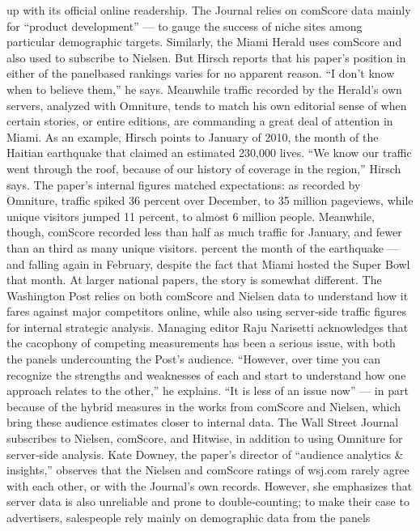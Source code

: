 up with its official online readership. The Journal relies on comScore data
mainly for ``product development'' — to gauge the success of niche sites
among particular demographic targets.
Similarly, the Miami Herald uses comScore and also used to subscribe to
Nielsen. But Hirsch reports that his paper’s position in either of the panelbased
rankings varies for no apparent reason. ``I don’t know when to
believe them,'' he says. Meanwhile traffic recorded by the Herald’s own
servers, analyzed with Omniture, tends to match his own editorial sense
of when certain stories, or entire editions, are commanding a great deal of
attention in Miami.
As an example, Hirsch points to January of 2010, the month of the Haitian
earthquake that claimed an estimated 230,000 lives. ``We know our traffic
went through the roof, because of our history of coverage in the region,''
Hirsch says. The paper’s internal figures matched expectations: as
recorded by Omniture, traffic spiked 36 percent over December, to 35
million pageviews, while unique visitors jumped 11 percent, to almost 6
million people. Meanwhile, though, comScore recorded less than half as
much traffic for January, and fewer than an third as many unique visitors.
percent the month of the earthquake — and falling again in February,
despite the fact that Miami hosted the Super Bowl that month.
At larger national papers, the story is somewhat different. The Washington
Post relies on both comScore and Nielsen data to understand how it fares
against major competitors online, while also using server‐side traffic
figures for internal strategic analysis. Managing editor Raju Narisetti
acknowledges that the cacophony of competing measurements has been a
serious issue, with both the panels undercounting the Post’s audience.
``However, over time you can recognize the strengths and weaknesses of
each and start to understand how one approach relates to the other,'' he
explains. ``It is less of an issue now'' — in part because of the hybrid
measures in the works from comScore and Nielsen, which bring these
audience estimates closer to internal data.
The Wall Street Journal subscribes to Nielsen, comScore, and Hitwise, in
addition to using Omniture for server‐side analysis. Kate Downey, the
paper’s director of ``audience analytics & insights,'' observes that the
Nielsen and comScore ratings of wsj.com rarely agree with each other, or
with the Journal’s own records. However, she emphasizes that server data
is also unreliable and prone to double‐counting; to make their case to
advertisers, salespeople rely mainly on demographic data from the panels

